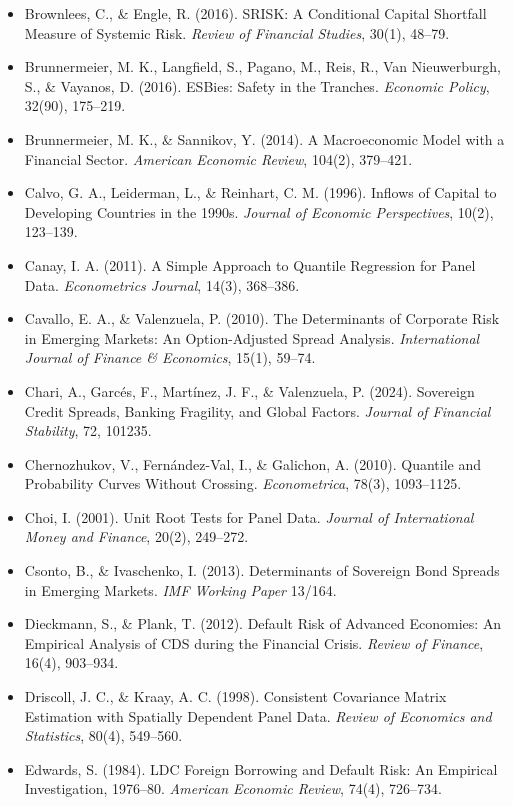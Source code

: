 \documentclass[5p,times,twocolumn,authoryear]{elsarticle}
\begin{document}
\begin{itemize}
    \item Brownlees, C., \& Engle, R. (2016). SRISK: A Conditional Capital Shortfall Measure of Systemic Risk. \textit{Review of Financial Studies}, 30(1), 48–79.
    \item Brunnermeier, M. K., Langfield, S., Pagano, M., Reis, R., Van Nieuwerburgh, S., \& Vayanos, D. (2016). ESBies: Safety in the Tranches. \textit{Economic Policy}, 32(90), 175–219.
    \item Brunnermeier, M. K., \& Sannikov, Y. (2014). A Macroeconomic Model with a Financial Sector. \textit{American Economic Review}, 104(2), 379–421.
    \item Calvo, G. A., Leiderman, L., \& Reinhart, C. M. (1996). Inflows of Capital to Developing Countries in the 1990s. \textit{Journal of Economic Perspectives}, 10(2), 123–139.
    \item Canay, I. A. (2011). A Simple Approach to Quantile Regression for Panel Data. \textit{Econometrics Journal}, 14(3), 368–386.
    \item Cavallo, E. A., \& Valenzuela, P. (2010). The Determinants of Corporate Risk in Emerging Markets: An Option-Adjusted Spread Analysis. \textit{International Journal of Finance \& Economics}, 15(1), 59–74.
    \item Chari, A., Garcés, F., Martínez, J. F., \& Valenzuela, P. (2024). Sovereign Credit Spreads, Banking Fragility, and Global Factors. \textit{Journal of Financial Stability}, 72, 101235.
    \item Chernozhukov, V., Fernández-Val, I., \& Galichon, A. (2010). Quantile and Probability Curves Without Crossing. \textit{Econometrica}, 78(3), 1093–1125.
    \item Choi, I. (2001). Unit Root Tests for Panel Data. \textit{Journal of International Money and Finance}, 20(2), 249–272.
    \item Csonto, B., \& Ivaschenko, I. (2013). Determinants of Sovereign Bond Spreads in Emerging Markets. \textit{IMF Working Paper} 13/164.
    \item Dieckmann, S., \& Plank, T. (2012). Default Risk of Advanced Economies: An Empirical Analysis of CDS during the Financial Crisis. \textit{Review of Finance}, 16(4), 903–934.
    \item Driscoll, J. C., \& Kraay, A. C. (1998). Consistent Covariance Matrix Estimation with Spatially Dependent Panel Data. \textit{Review of Economics and Statistics}, 80(4), 549–560.
    \item Edwards, S. (1984). LDC Foreign Borrowing and Default Risk: An Empirical Investigation, 1976–80. \textit{American Economic Review}, 74(4), 726–734.

\end{itemize}
\end{document}
